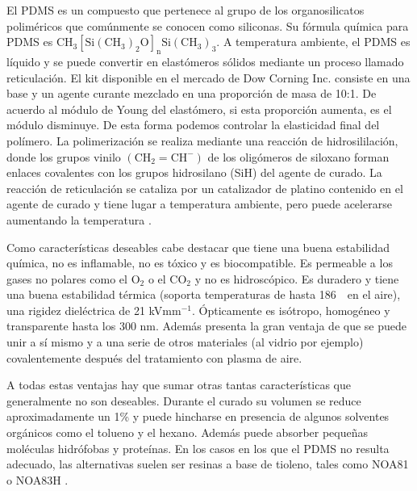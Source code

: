 El PDMS es un compuesto que pertenece al grupo de los organosilicatos poliméricos que comúnmente se conocen como siliconas. Su fórmula química para PDMS es $\mathrm{{CH}_{3} {[Si {({CH}_{3})}_{2} O]}_{n} Si {({CH}_{3})}_{3}}$.
A temperatura ambiente, el PDMS es líquido y se puede convertir en elastómeros sólidos mediante un proceso llamado reticulación. El kit  disponible en el mercado de Dow Corning Inc. consiste en una base y un agente curante mezclado en una proporción de masa de 10:1. De acuerdo al módulo de Young del elastómero, si esta proporción aumenta, es el módulo disminuye. De esta forma podemos controlar la elasticidad final del polímero. La polimerización se realiza mediante una reacción de hidrosililación, donde los grupos vinilo $\mathrm{({CH}_{2}={CH}^{-})}$ de los oligómeros de siloxano forman enlaces covalentes con los grupos hidrosilano (SiH) del agente de curado. La reacción de reticulación se cataliza por un catalizador de platino contenido en el agente de curado y tiene lugar a temperatura ambiente, pero puede acelerarse aumentando la temperatura \citep{book:andreas}.

Como características deseables cabe destacar que tiene una buena estabilidad química, no es inflamable, no es tóxico y es biocompatible. Es permeable a los gases no polares como el $\mathrm{O}_{2}$ o el $\mathrm{CO}_{2}$ y no es hidroscópico. Es duradero y tiene una buena estabilidad térmica (soporta temperaturas de hasta 186~\celsius\ en el aire), una rigidez dieléctrica de 21 kV$\mathrm{{mm}^{-1}}$. Ópticamente es isótropo, homogéneo y transparente hasta los 300 nm.
Además presenta la gran ventaja de que se puede unir a sí mismo y a una serie de otros materiales (al vidrio por ejemplo) covalentemente después del tratamiento con plasma de aire.

A todas estas ventajas hay que sumar otras tantas características que generalmente no son deseables. Durante el curado su volumen se reduce aproximadamente un 1\% y puede hincharse en presencia de algunos solventes orgánicos como el tolueno y el hexano. Además puede absorber pequeñas moléculas hidrófobas y proteínas. 
En los casos en los que el PDMS no resulta adecuado, las alternativas suelen ser resinas a base de tioleno, tales como NOA81 o NOA83H \citep{article:ralf}.

